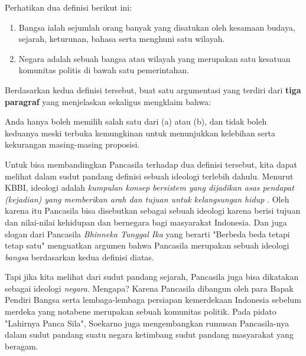 \documentclass[
  12pt,
  answers  
]{exam}
\begin{document}
    \begin{questions}
      \question 
      Perhatikan dua definisi berikut ini:
      \begin{enumerate}
        \item Bangsa ialah sejumlah orang banyak yang disatukan oleh kesamaan budaya, sejarah, keturunan, bahasa serta menghuni satu wilayah.
        \item Negara adalah sebuah bangsa atau wilayah yang merupakan satu kesatuan komunitas politis di bawah satu pemerintahan.
      \end{enumerate}

      Berdasarkan kedua definisi tersebut, buat satu argumentasi yang terdiri dari \textbf{tiga paragraf} yang menjelaskan sekaligus mengklaim bahwa:

      Anda hanya boleh memilih salah satu dari (a) atau (b), dan tidak boleh keduanya meski terbuka kemungkinan untuk menunjukkan kelebihan serta kekurangan masing-masing proposisi.

      \begin{solution}
        Untuk bisa membandingkan Pancasila terhadap dua definisi tersebut, kita dapat melihat dalam sudut pandang definisi sebuah ideologi terlebih dahulu. Menurut KBBI, ideologi adalah \emph{kumpulan konsep bersistem yang dijadikan asas pendapat (kejadian) yang memberikan arah dan tujuan untuk kelangsungan hidup} \cite{badanpusatpengembangandanpembinaanbahasaIdeologi}. Oleh karena itu Pancasila bisa disebutkan sebagai sebuah ideologi karena berisi tujuan dan nilai-nilai kehidupan dan bernegara bagi masyarakat Indonesia. Dan juga slogan dari Pancasila \emph{Bhinneka Tunggal Ika} yang berarti "Berbeda beda tetapi tetap satu" menguatkan argumen bahwa Pancasila merupakan sebuah ideologi \emph{bangsa} berdasarkan kedua definisi diatas.

        Tapi jika kita melihat dari sudut pandang sejarah, Pancasila juga bisa dikatakan sebagai ideologi \emph{negara}. Mengapa? Karena Pancasila dibangun oleh para Bapak Pendiri Bangsa serta lembaga-lembaga persiapan kemerdekaan Indonesia sebelum merdeka yang notabene merupakan sebuah komunitas politik. Pada pidato "Lahirnya Panca Sila", Soekarno juga mengembangkan rumusan Pancasila-nya dalam sudut pandang suatu negara ketimbang sudut pandang masyarakat yang beragam. \cite{soekarnoLahirnyaPancaSila}


\end{solution}
\end{questions}
\end{document}
